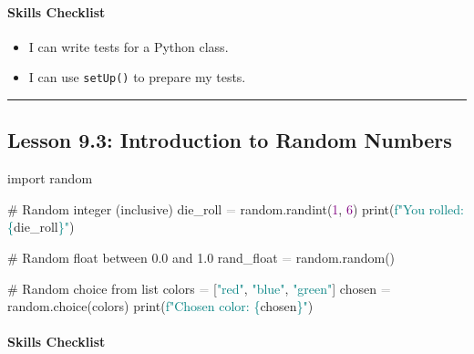 \documentclass[
  justified,
  openright,
]{tufte-book}
\let\subsubsection\paragraph
\let\paragraph\paragraph
\newcommand{\BuiltInTok}[1]{#1}
\newcommand{\CommentTok}[1]{\textcolor{MidGray}{#1}}
\newcommand{\DecValTok}[1]{\textcolor{Purple}{#1}}
\newcommand{\ImportTok}[1]{\textcolor{BrandAccent}{#1}}
\newcommand{\NormalTok}[1]{#1}
\newcommand{\OperatorTok}[1]{\textcolor{DarkGray}{#1}}
\newcommand{\SpecialCharTok}[1]{\textcolor{Teal}{#1}}
\newcommand{\SpecialStringTok}[1]{\textcolor{Teal}{#1}}
\newcommand{\StringTok}[1]{\textcolor{Teal}{#1}}
\newenvironment{Shaded}{%
  \begin{snugshade}
}{%
  \end{snugshade}
}
\let\subsubsection\paragraph
\let\paragraph\paragraph
\providecommand{\tightlist}{%
  \setlength{\itemsep}{0pt}\setlength{\parskip}{0pt}}
\begin{document}
\subsubsection{Skills Checklist}\label{skills-checklist-43}

\begin{itemize}
\tightlist
\item[$\square$]
  I can write tests for a Python class.
\item[$\square$]
  I can use \texttt{setUp()} to prepare my tests.
\end{itemize}

\begin{center}\rule{0.5\linewidth}{0.5pt}\end{center}

\subsection{Lesson 9.3: Introduction to Random
Numbers}\label{lesson-9.3-introduction-to-random-numbers}

\begin{Shaded}
\begin{Highlighting}[]
\ImportTok{import}\NormalTok{ random}

\CommentTok{\# Random integer (inclusive)}
\NormalTok{die\_roll }\OperatorTok{=}\NormalTok{ random.randint(}\DecValTok{1}\NormalTok{, }\DecValTok{6}\NormalTok{)}
\BuiltInTok{print}\NormalTok{(}\SpecialStringTok{f"You rolled: }\SpecialCharTok{\{}\NormalTok{die\_roll}\SpecialCharTok{\}}\SpecialStringTok{"}\NormalTok{)}

\CommentTok{\# Random float between 0.0 and 1.0}
\NormalTok{rand\_float }\OperatorTok{=}\NormalTok{ random.random()}

\CommentTok{\# Random choice from list}
\NormalTok{colors }\OperatorTok{=}\NormalTok{ [}\StringTok{"red"}\NormalTok{, }\StringTok{"blue"}\NormalTok{, }\StringTok{"green"}\NormalTok{]}
\NormalTok{chosen }\OperatorTok{=}\NormalTok{ random.choice(colors)}
\BuiltInTok{print}\NormalTok{(}\SpecialStringTok{f"Chosen color: }\SpecialCharTok{\{}\NormalTok{chosen}\SpecialCharTok{\}}\SpecialStringTok{"}\NormalTok{)}
\end{Highlighting}
\end{Shaded}

\subsubsection{Skills Checklist}\label{skills-checklist-44}
\end{document}

